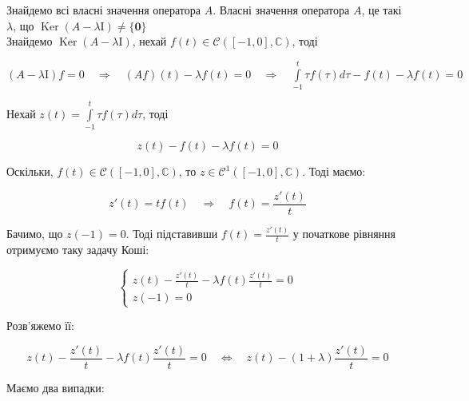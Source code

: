 \documentclass[a5paper, 20pt, titlepage]{article}
\DeclareMathOperator{\Ker}{Ker}
\newcommand{\I}{\mathrm{I}}
\begin{document}
Знайдемо всі власні значення оператора $A$. Власні значення оператора $A$, це такі $\lambda$, що $\Ker(A - \lambda \I) \neq \{ \textbf{0} \}$\\ Знайдемо $\Ker(A - \lambda \I)$, нехай $f(t) \in \mathcal{C} \left( [-1, 0], \mathbb{C} \right)$, тоді

\vspace{3mm}
\hspace{4mm}
$(A - \lambda \I) f = 0 \quad \Rightarrow \quad (Af)(t) - \lambda f(t) = 0 \quad \Rightarrow \quad \int \limits_{-1}^{t} \tau f(\tau) d \tau - f(t) - \lambda f(t) = 0$

\vspace{3mm}
Нехай $z(t) = \int \limits_{-1}^{t} \tau f(\tau) d \tau  $, тоді 

$$ z(t) - f(t) - \lambda f(t) = 0 $$

\vspace{3mm}
Оскільки,  $f(t) \in \mathcal{C} \left( [-1, 0], \mathbb{C} \right)$, то $z \in \mathcal{C}^1 \left( [-1, 0], \mathbb{C} \right)$. Тоді маємо:

$$ z'(t) = t f(t) \quad \Rightarrow \quad f(t) = \frac{z'(t)}{t} $$

\vspace{3mm}
Бачимо, що $z(-1) = 0$. Тоді підставивши $f(t) = \frac{z'(t)}{t}$ у початкове рівняння отримуємо таку задачу Коші:

$$
\begin{cases}
z(t) - \frac{z'(t)}{t} - \lambda f(t) \frac{z'(t)}{t} = 0 \\
z(-1) = 0
\end{cases}
$$

Розв'яжемо її:

$$ z(t) - \frac{z'(t)}{t} - \lambda f(t) \frac{z'(t)}{t} = 0 \quad \Leftrightarrow \quad z(t) - \left( 1 + \lambda \right) \frac{z'(t)}{t} = 0  $$

Маємо два випадки:
\end{document}
